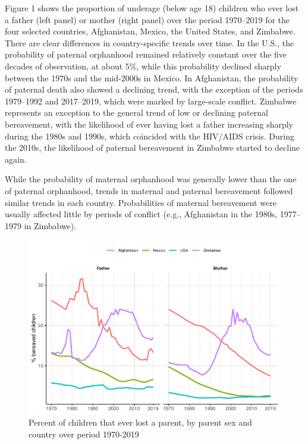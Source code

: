 \documentclass[
  11pt,
  letterpaper,
]{article}
\begin{document}
Figure 1 shows the proportion of underage (below age 18) children who ever lost a father (left panel) or mother (right panel) over the period 1970--2019 for the four selected countries, Afghanistan, Mexico, the United States, and Zimbabwe. There are clear differences in country-specific trends over time. In the U.S., the probability of paternal orphanhood remained relatively constant over the five decades of observation, at about 5\%, while this probability declined sharply between the 1970s and the mid-2000s in Mexico. In Afghanistan, the probability of paternal death also showed a declining trend, with the exception of the periods 1979--1992 and 2017--2019, which were marked by large-scale conflict. Zimbabwe represents an exception to the general trend of low or declining paternal bereavement, with the likelihood of ever having lost a father increasing sharply during the 1980s and 1990s, which coincided with the HIV/AIDS crisis. During the 2010s, the likelihood of paternal bereavement in Zimbabwe started to decline again.

While the probability of maternal orphanhood was generally lower than the one of paternal orphanhood, trends in maternal and paternal bereavement followed similar trends in each country. Probabilities of maternal bereavement were usually affected little by periods of conflict (e.g., Afghanistan in the 1980s, 1977--1979 in Zimbabwe).

\begin{figure}
\centering
\includegraphics{parental_loss_global_paa_ext_abstract_files/figure-latex/perc-ber-all-1.pdf}
\caption{\label{fig:perc-ber-all}Percent of children that ever lost a parent, by parent sex and country over period 1970-2019}
\end{figure}
\end{document}
